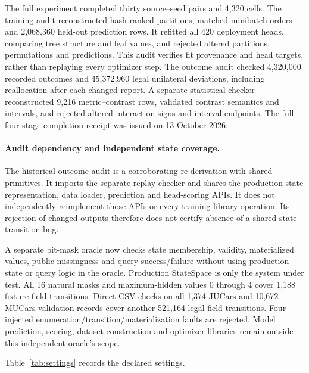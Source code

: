 \documentclass[11pt]{article}
\begin{document}
The full experiment completed thirty source--seed pairs and 4,320 cells.
The training audit reconstructed hash-ranked partitions, matched minibatch
orders and 2,068,360 held-out prediction rows. It refitted all
420 deployment heads, comparing tree structure and leaf values, and rejected
altered partitions, permutations and predictions. This audit verifies fit
provenance and head targets, rather than replaying every optimizer step.
The outcome audit checked 4,320,000 recorded outcomes and 45,372,960 legal
unilateral deviations, including reallocation after each changed report.
A separate statistical checker reconstructed 9,216 metric--contrast rows,
validated contrast semantics and intervals, and rejected altered interaction
signs and interval endpoints. The full four-stage completion receipt was
issued on 13 October 2026.

\paragraph{Audit dependency and independent state coverage.}
The historical outcome audit is a corroborating re-derivation with shared
primitives. It imports the separate replay checker and shares the production
state representation, data loader, prediction and head-scoring APIs. It does
not independently reimplement those APIs or every training-library operation.
Its rejection of changed outputs therefore does not certify absence of a
shared state-transition bug.

A separate bit-mask oracle now checks state membership, validity,
materialized values, public missingness and query success/failure without
using production state or query logic in the oracle. Production StateSpace is
only the system under test. All 16 natural masks and maximum-hidden values
0 through 4 cover 1,188 fixture field transitions. Direct CSV checks on all
1,374 JUCars and 10,672 MUCars validation records cover another 521,164 legal
field transitions. Four injected enumeration/transition/materialization
faults are rejected. Model prediction, scoring, dataset construction and
optimizer libraries remain outside this independent oracle's scope.

Table~\ref{tab:settings} records the declared settings.
\end{document}
